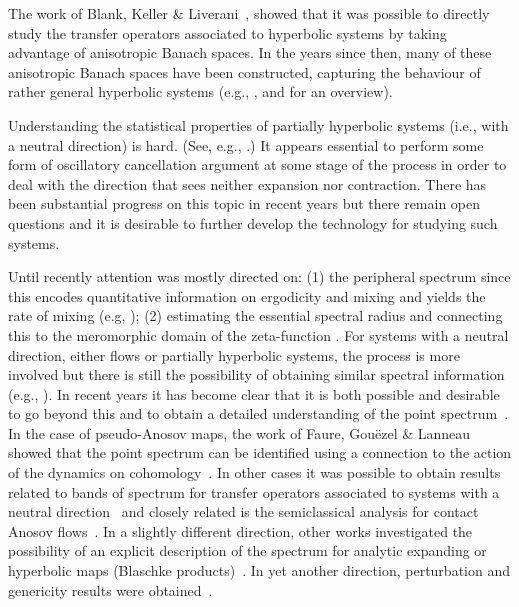 \documentclass[a4paper,11pt]{amsart}
\theoremstyle{remark}
\begin{document}
The work of Blank, Keller \& Liverani~\cite{BKL02}, showed that it was possible to directly study the transfer operators associated to hyperbolic systems by taking advantage of anisotropic Banach spaces.
In the years since then, many of these anisotropic Banach spaces have been constructed, capturing the behaviour of rather general hyperbolic systems (e.g., \cite{GL06, GL08, BT07, BT08, FRS08}, and \cite{Baladi16, Baladi17} for an overview).

Understanding the statistical properties of partially hyperbolic systems (i.e., with a neutral direction) is hard.
(See, e.g., \cite{Dolgopyat98,BL07,BL13,Butterley16,ABV16,BE17,BW20,CL22,TZ23}.)
It appears essential to perform some form of oscillatory cancellation argument at some stage of the process in order to deal with the direction that sees neither expansion nor contraction.
There has been substantial progress on this topic in recent years but there remain open questions and it is desirable to further develop the technology for studying such systems.

Until recently attention was mostly directed on: (1) the peripheral spectrum since this encodes quantitative information on ergodicity and mixing and yields the rate of mixing (e.g, \cite{Liverani95,Baladi00}); (2) estimating the essential spectral radius and connecting this to the meromorphic domain of the zeta-function \cite{Baladi16}. 
For systems with a neutral direction, either flows or partially hyperbolic systems, the process is more involved but there is still the possibility of obtaining similar spectral information (e.g., \cite{Faure07,FT13,FT15,GHW16,FT17,GF18}).
In recent years it has become clear that it is both possible and desirable to go beyond this and to obtain a detailed understanding of the point spectrum~\cite{FT17, DZ16, DZ17, GF18, GL19, FGL19, BS20, KW20, Baladi22, BKL22, GGHW24, BCJ22, BCC24}.
In the case of pseudo-Anosov maps, the work of Faure, Gouëzel \& Lanneau showed that the point spectrum can be identified using a connection to the action of the dynamics on cohomology~\cite{FGL19}.
In other cases it was possible to obtain results related to bands of spectrum for transfer operators associated to systems with a neutral direction~\cite{Faure07,FT13,FT15,FT17, BS20} and closely related is the semiclassical analysis for contact Anosov flows~\cite{FT13,GHW16}.
In a slightly different direction, other works investigated the possibility of an explicit description of the spectrum for analytic expanding or hyperbolic maps (Blaschke products)~\cite{SBJ13, BJS17, SBJ17}.
In yet another direction, perturbation and genericity results were obtained~\cite{KR04, Naud12, Adam17, BN19}.
\end{document}
